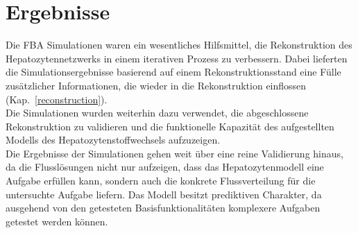 
\section{Ergebnisse}
Die FBA Simulationen waren ein wesentliches Hilfsmittel, die Rekonstruktion des Hepatozytennetzwerks in einem iterativen Prozess zu verbessern. Dabei lieferten die Simulationsergebnisse basierend auf einem Rekonstruktionsstand eine Fülle zusätzlicher Informationen, die wieder in die Rekonstruktion einflossen (Kap.~\ref{reconstruction}).\\
Die Simulationen wurden weiterhin dazu verwendet, die abgeschlossene Rekonstruktion zu validieren und die funktionelle Kapazität des aufgestellten Modells des Hepatozytenstoffwechsels aufzuzeigen. \\
Die Ergebnisse der Simulationen gehen weit über eine reine Validierung hinaus, da die Flusslösungen nicht nur aufzeigen, dass das Hepatozytenmodell eine Aufgabe erfüllen kann, sondern auch die konkrete Flussverteilung für die untersuchte Aufgabe liefern. Das Modell besitzt prediktiven Charakter, da ausgehend von den getesteten Basisfunktionalitäten komplexere Aufgaben getestet werden können.

